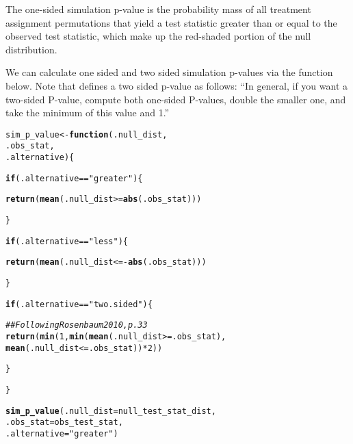 \documentclass[11pt]{article}\usepackage[]{graphicx}\usepackage[]{color}
\makeatletter
\newcommand{\hlnum}[1]{\textcolor[rgb]{0.686,0.059,0.569}{#1}}%
\newcommand{\hlstr}[1]{\textcolor[rgb]{0.192,0.494,0.8}{#1}}%
\newcommand{\hlcom}[1]{\textcolor[rgb]{0.678,0.584,0.686}{\textit{#1}}}%
\newcommand{\hlopt}[1]{\textcolor[rgb]{0,0,0}{#1}}%
\newcommand{\hlstd}[1]{\textcolor[rgb]{0.345,0.345,0.345}{#1}}%
\newcommand{\hlkwa}[1]{\textcolor[rgb]{0.161,0.373,0.58}{\textbf{#1}}}%
\newcommand{\hlkwb}[1]{\textcolor[rgb]{0.69,0.353,0.396}{#1}}%
\newcommand{\hlkwc}[1]{\textcolor[rgb]{0.333,0.667,0.333}{#1}}%
\newcommand{\hlkwd}[1]{\textcolor[rgb]{0.737,0.353,0.396}{\textbf{#1}}}%
\newenvironment{kframe}{%
 \def\at@end@of@kframe{}%
 \ifinner\ifhmode%
  \def\at@end@of@kframe{\end{minipage}}%
  \begin{minipage}{\columnwidth}%
 \fi\fi%
 \def\FrameCommand##1{\hskip\@totalleftmargin \hskip-\fboxsep
 \colorbox{shadecolor}{##1}\hskip-\fboxsep
     \hskip-\linewidth \hskip-\@totalleftmargin \hskip\columnwidth}%
 \MakeFramed {\advance\hsize-\width
   \@totalleftmargin\z@ \linewidth\hsize
   \@setminipage}}%
 {\par\unskip\endMakeFramed%
 \at@end@of@kframe}
\newenvironment{knitrout}{}{} %
\theoremstyle{newstyle}
\makeatother
\begin{document}
The one-sided simulation p-value is the probability mass of all treatment assignment permutations that yield a test statistic greater than or equal to the observed test statistic, which make up the red-shaded portion of the null distribution.

We can calculate one sided and two sided simulation p-values via the function below. Note that \citet[33]{rosenbaum2010} defines a two sided p-value as follows: ``In general, if you want a two-sided P-value, compute both one-sided P-values, double the smaller one, and take the minimum of this value and 1.''

\begin{knitrout}
\color{fgcolor}\begin{kframe}
\begin{alltt}
\hlstd{sim_p_value} \hlkwb{<-} \hlkwa{function}\hlstd{(}\hlkwc{.null_dist}\hlstd{,}
                        \hlkwc{.obs_stat}\hlstd{,}
                        \hlkwc{.alternative}\hlstd{)\{}

  \hlkwa{if}\hlstd{(.alternative} \hlopt{==} \hlstr{"greater"}\hlstd{) \{}

    \hlkwd{return}\hlstd{(}\hlkwd{mean}\hlstd{(.null_dist} \hlopt{>=} \hlkwd{abs}\hlstd{(.obs_stat)))}

  \hlstd{\}}

  \hlkwa{if}\hlstd{(.alternative} \hlopt{==} \hlstr{"less"}\hlstd{) \{}


    \hlkwd{return}\hlstd{(}\hlkwd{mean}\hlstd{(.null_dist} \hlopt{<= -}\hlkwd{abs}\hlstd{(.obs_stat)))}

  \hlstd{\}}

  \hlkwa{if}\hlstd{(.alternative} \hlopt{==} \hlstr{"two.sided"}\hlstd{)\{}

    \hlcom{## Following Rosenbaum 2010, p. 33}
    \hlkwd{return}\hlstd{(}\hlkwd{min}\hlstd{(}\hlnum{1}\hlstd{,} \hlkwd{min}\hlstd{(}\hlkwd{mean}\hlstd{(.null_dist} \hlopt{>=} \hlstd{.obs_stat),}
               \hlkwd{mean}\hlstd{(.null_dist} \hlopt{<=} \hlstd{.obs_stat))} \hlopt{*} \hlnum{2}\hlstd{))}

  \hlstd{\}}

\hlstd{\}}

\hlkwd{sim_p_value}\hlstd{(}\hlkwc{.null_dist} \hlstd{= null_test_stat_dist,}
            \hlkwc{.obs_stat} \hlstd{= obs_test_stat,}
            \hlkwc{.alternative} \hlstd{=} \hlstr{"greater"}\hlstd{)}
\end{alltt}


{\ttfamily\noindent\bfseries\color{errorcolor}{\#\# Error in mean(.null\_dist >= abs(.obs\_stat)): object 'null\_test\_stat\_dist' not found}}\end{kframe}
\end{knitrout}
\end{document}

